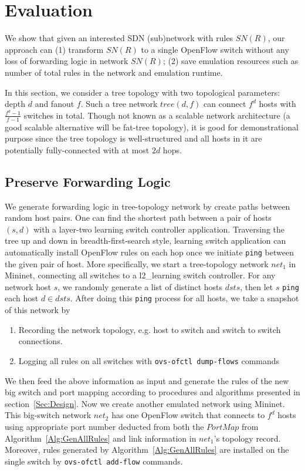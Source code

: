 \section{Evaluation}
We show that given an interested SDN (sub)network with rules $SN(R)$, our approach can 
(1) transform $SN(R)$ to a single OpenFlow switch without any loss of forwarding logic in network $SN(R)$;
(2) save emulation resources such as number of total rules in the network and emulation runtime.

In this section, we consider a tree topology with two topological parameters: depth $d$ and fanout $f$.
Such a tree network $tree(d, f)$ can connect $f^d$ hosts with $\frac{f^d - 1}{f-1}$ switches in total.
Though not known as a scalable network architecture
(a good scalable alternative will be fat-tree topology),
it is good for demonstrational purpose since the tree topology is well-structured and
all hosts in it are potentially fully-connected with at most $2d$ hops.

\subsection{Preserve Forwarding Logic}
We generate forwarding logic in tree-topology network by create paths between random host pairs.
One can find the shortest path between a pair of hosts $(s, d)$ with
a layer-two learning switch controller application.
Traversing the tree up and down in breadth-first-search style, learning switch application
can automatically install OpenFlow rules on each hop once we initiate \texttt{ping} between
the given pair of host.
More specifically, we start a tree-topology network $net_1$ in Mininet\cite{Mininet},
connecting all switches to a l2\_learning\cite{Pox} switch controller.
For any network host $s$, we randomly generate a list of distinct hosts $dsts$,
then let $s$ \texttt{ping} each host $d \in dsts$.
After doing this \texttt{ping} process for all hosts, we take a snapshot of this network by
\begin{enumerate}
\item Recording the network topology, e.g. host to switch and switch to switch connections.
\item Logging all rules on all switches with \texttt{ovs-ofctl dump-flows} commands
\end{enumerate}
We then feed the above information as input and generate the rules of the new big switch
and port mapping according to procedures and algorithms presented in section~\ref{Sec:Design}.
Now we create another emulated network using Mininet.
This big-switch network $net_2$ has one OpenFlow switch that connects to $f^d$ hosts using
appropriate port number deducted from both the $PortMap$ from Algorithm~\ref{Alg:GenAllRules}
and link information in $net_1$'s topology record.
Moreover, rules generated by Algorithm~\ref{Alg:GenAllRules} are installed on the single
switch by \texttt{ovs-ofctl add-flow} commands.

